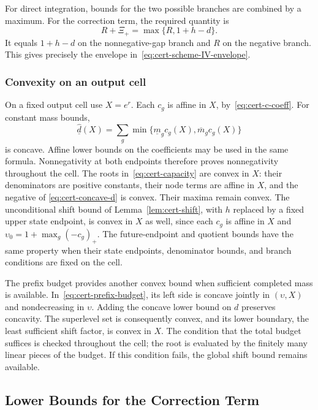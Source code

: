 \documentclass[11pt]{article}
\theoremstyle{definition}
\theoremstyle{remark}
\begin{document}
For direct integration, bounds for the two possible branches are combined
by a maximum.  For the correction term, the required quantity is
\begin{equation}\label{eq:cert-credit-compatible}
 R+\Xi_+=\max\{R,1+h-d\}.
\end{equation}
It equals $1+h-d$ on the nonnegative-gap branch and $R$ on the negative
branch.  This gives precisely the envelope in~\eqref{eq:cert-scheme-IV-envelope}.

\subsubsection{Convexity on an output cell}
\label{app:cert-convex-bounds}

On a fixed output cell use $X=e^r$.
Each $c_g$ is affine in $X$, by~\eqref{eq:cert-c-coeff}.
For constant mass bounds,
\begin{equation}\label{eq:cert-concave-d}
 \underline{\hat d}(X)=
 \sum_g\min\{\underline m_g c_g(X),\overline m_g c_g(X)\}
\end{equation}
is concave.  Affine lower bounds on the coefficients may be used in the
same formula.
Nonnegativity at both endpoints therefore proves nonnegativity throughout
the cell.  The roots in~\eqref{eq:cert-capacity} are convex in $X$: their denominators are positive
constants, their node terms are affine in $X$, and the negative of
\eqref{eq:cert-concave-d} is convex.  Their maxima remain convex.
The unconditional shift bound of Lemma~\ref{lem:cert-shift}, with $h$
replaced by a fixed upper state endpoint, is convex in $X$ as well,
since each $c_g$ is affine in $X$ and
$\upsilon_0=1+\max_g(-c_g)_+$.
The future-endpoint and quotient bounds have the same property when their
state endpoints, denominator bounds, and branch conditions are fixed on
the cell.

The prefix budget provides another convex bound when sufficient completed
mass is available.  In~\eqref{eq:cert-prefix-budget}, its left side is
concave jointly in $(\upsilon,X)$ and nondecreasing in $\upsilon$.
Adding the concave lower bound on $d$ preserves concavity.
The superlevel set is consequently convex, and its lower boundary, the
least sufficient shift factor, is convex in $X$.
The condition that the total budget suffices is checked throughout the
cell; the root is evaluated by the finitely many linear pieces of the
budget.  If this condition fails, the global shift bound remains available.

\subsection{Lower Bounds for the Correction Term}
\label{app:cert-credit}
\end{document}
